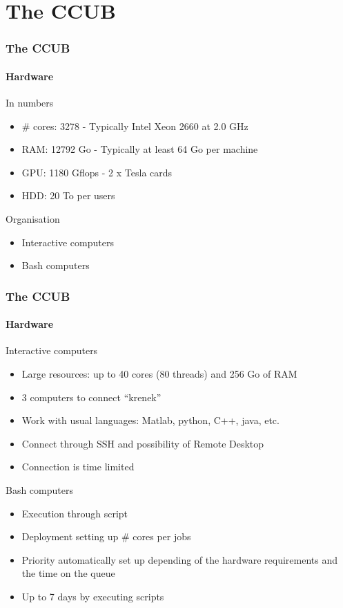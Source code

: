 \documentclass{beamer}
\newcommand{\tick}{\color{green!60!black!80}\ding{51}}
\newcommand{\cross}{\color{red!60!black!80}\ding{55}}
\begin{document}
\section{The CCUB}


\begin{frame}
  \frametitle{The CCUB}
  \framesubtitle{Hardware}
  \begin{block}{In numbers}\footnotesize
    \begin{itemize}
    \item \# cores: 3278 - Typically Intel Xeon 2660 at 2.0 GHz
    \item RAM: 12792 Go - Typically at least 64 Go per machine
    \item GPU: 1180 Gflops - 2 x Tesla cards
    \item HDD: 20 To per users
    \end{itemize}
  \end{block}
  \begin{block}{Organisation}\footnotesize
    \begin{itemize}
    \item Interactive computers
    \item Bash computers
    \end{itemize}
  \end{block}
\end{frame}

\begin{frame}
  \frametitle{The CCUB}
  \framesubtitle{Hardware}
  \begin{block}{Interactive computers}\footnotesize
    \begin{itemize}
    \item Large resources: up to 40 cores (80 threads) and 256 Go of RAM
    \item 3 computers to connect ``krenek''
    \item Work with usual languages: Matlab, python, C++, java, etc.
    \item Connect through SSH and possibility of Remote Desktop
    \item[\cross] Connection is time limited
    \end{itemize}
  \end{block}
  \begin{block}{Bash computers}\footnotesize
    \begin{itemize}
    \item Execution through script
    \item Deployment setting up \# cores per jobs
    \item Priority automatically set up depending of the hardware requirements and the time on the queue
    \item[\tick] Up to 7 days by executing scripts
    \end{itemize}
  \end{block}
\end{frame}
\end{document}

